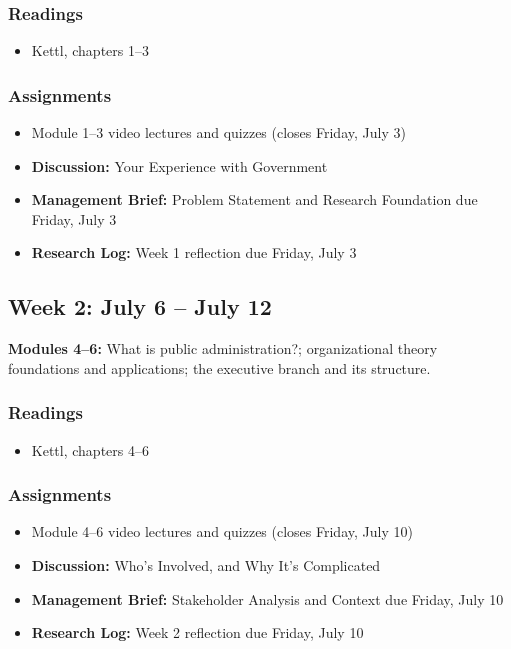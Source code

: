 \documentclass[12pt]{article}
\begin{document}
\subsubsection*{Readings}
    \begin{itemize}
        \item Kettl, chapters 1--3
    \end{itemize}
\subsubsection*{Assignments}
    \begin{itemize}
        \item Module 1--3 video lectures and quizzes (closes Friday, July 3)
        \item \textbf{Discussion:} Your Experience with Government
        \item \textbf{Management Brief:} Problem Statement and Research Foundation due Friday, July 3
        \item \textbf{Research Log:} Week 1 reflection due Friday, July 3
    \end{itemize}

\subsection*{Week 2: July 6 -- July 12}
\noindent \textbf{Modules 4--6:} What is public administration?; organizational theory foundations and applications; the executive branch and its structure.
\subsubsection*{Readings}
    \begin{itemize}
        \item Kettl, chapters 4--6
    \end{itemize}
\subsubsection*{Assignments}
    \begin{itemize}
        \item Module 4--6 video lectures and quizzes (closes Friday, July 10)
        \item \textbf{Discussion:} Who's Involved, and Why It's Complicated
        \item \textbf{Management Brief:} Stakeholder Analysis and Context due Friday, July 10
        \item \textbf{Research Log:} Week 2 reflection due Friday, July 10
    \end{itemize}
\end{document}
